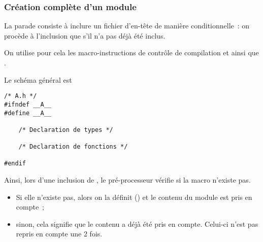 \begin{frame}[fragile]
\frametitle{Création complète d'un module}
La parade consiste à \alert{inclure} un fichier d'en-tête de
\alert{manière conditionnelle}~: on procède à l'inclusion que s'il n'a
pas déjà été inclus.
\medskip

On utilise pour cela les macro-instructions de contrôle de compilation
 et  ainsi que .
\medskip

Le schéma général est
\medskip

\begin{minipage}[c]{.49\textwidth}
\begin{lstlisting}[frame=single,numbers=none]
/* A.h */
#ifndef __A__
#define __A__

    /* Declaration de types */

    /* Declaration de fonctions */

#endif
\end{lstlisting}
\end{minipage}\quad
\begin{minipage}[c]{.45\textwidth}
    Ainsi, lors d'une inclusion de , le pré-processeur
    vérifie si la macro  n'existe pas.
    \begin{itemize}
        \item Si elle n'existe pas, alors on la définit
        () et le contenu du module est pris
        en compte~;
        \item sinon, cela signifie que le contenu a déjà été pris en
        compte. Celui-ci n'est pas repris en compte une 2\ieme{} fois.
    \end{itemize}
\end{minipage}
\end{frame}

